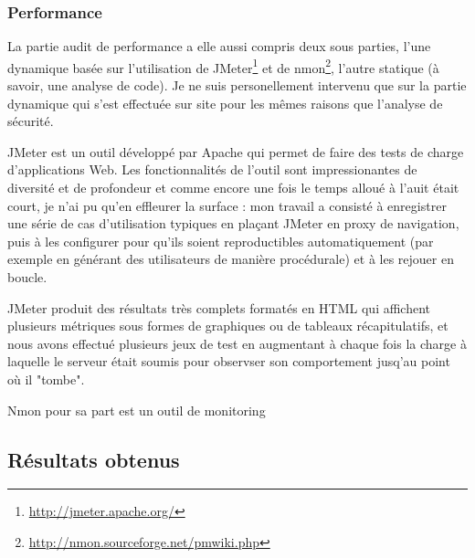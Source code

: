 \subsubsection{Performance}
La partie audit de performance a elle aussi compris deux sous parties, l'une dynamique basée sur l'utilisation de JMeter\footnote{\url{http://jmeter.apache.org/}} et de nmon\footnote{\url{http://nmon.sourceforge.net/pmwiki.php}}, l'autre statique (à savoir, une analyse de code). Je ne suis personellement intervenu que sur la partie dynamique qui s'est effectuée sur site pour les mêmes raisons que l'analyse de sécurité.

JMeter est un outil développé par Apache qui permet de faire des tests de charge d'applications Web. Les fonctionnalités de l'outil sont impressionantes de diversité et de profondeur et comme encore une fois le temps alloué à l'auit était court, je n'ai pu qu'en effleurer la surface : mon travail a consisté à enregistrer une série de cas d'utilisation typiques en plaçant JMeter en proxy de navigation, puis à les configurer pour qu'ils soient reproductibles automatiquement (par exemple en générant des utilisateurs de manière procédurale) et à les rejouer en boucle.

JMeter produit des résultats très complets formatés en HTML qui affichent plusieurs métriques sous formes de graphiques ou de tableaux récapitulatifs, et nous avons effectué plusieurs jeux de test en augmentant à chaque fois la charge à laquelle le serveur était soumis pour observser son comportement jusq'au point où il "tombe".

Nmon pour sa part est un outil de monitoring

\subsubsection{}

\subsection{Résultats obtenus}
